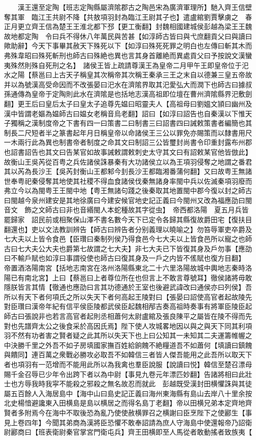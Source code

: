 　　漢王還至定陶【班志定陶縣屬濟隂郡古之陶邑宋為廣濟軍理所】馳入齊王信壁奪其軍　臨江王共尉不降【共敖項羽封為臨江王尉其子也】遣盧綰劉賈擊虜之　春正月更立齊王信為楚王王淮北都下邳【更工衡翻】封魏相國建城侯彭越為梁王王魏故地都定陶　令曰兵不得休八年萬民與苦甚【如淳師古皆曰與弋庶翻貢父曰與讀曰歟助辭】今天下事畢其赦天下殊死以下【如淳曰殊死死罪之明白也左傳曰斬其木而弗殊韋昭曰殊死斬刑也師古曰殊絶也異也言其身首離絶而異處貢父曰予按說文漢蠻夷殊然則殊自死刑之名】　諸侯王皆上疏請尊漢王為皇帝二月甲午王即皇帝位于汜水之陽【蔡邕曰上古天子稱皇其次稱帝其次稱王秦承三王之末自以德兼三皇五帝故并以為號漢高受命因而不改張晏曰汜水在濟隂界取其汜愛弘大而潤下也師古曰據叔孫通傳為皇帝于定陶則此水在濟隂是也括地志漢高祖即位壇在曹州濟隂縣界汜敷劍翻】更王后曰皇后太子曰皇太子追尊先媪曰昭靈夫人【高祖母曰劉媼文頴曰幽州及漢中皆謂老嫗為媪師古曰媪女老稱音烏老翻】詔曰【如淳曰詔告也自秦漢以下惟天子獨稱之漢制度帝之下書有四一曰策書二曰制書三曰詔書四曰誡敕策書者編簡也其制長二尺短者半之篆書起年月日稱皇帝以命諸侯王三公以罪免亦賜策而以隸書用尺一木兩行此為異也制書帝者制度之命其文曰制詔三公皆璽封尚書令印重封露布州郡也詔書詔告也其文曰告某官如故事誡敕謂敕刺史太守其文曰有詔敕某官他皆倣此】故衡山王吳芮從百粤之兵佐諸侯誅暴秦有大功諸侯立以為王項羽侵奪之地謂之番君其以芮為長沙王【吳芮封衡山王都邾今刲長沙王都臨湘番蒲何翻】又曰故粤王無諸世奉粤祀秦侵奪其地使其社稷不得血食諸侯伐秦無諸身率閩中兵以佐滅秦項羽廢而弗立今以為閩粤王王閩中地【粤王無諸句踐之後秦取其地置閩中郡今復以封之師古曰閩越今泉州建安是其地徐廣曰今建安候官地史記正義曰今閩州又改為福應劭曰閩音文　飾之文師古曰非也音緡閩人本蛇種故其字從虫】　帝西都洛陽　夏五月兵皆罷歸家　詔民前或相聚保山澤不書名數今天下已定令各歸其縣復故爵田宅【復扶目翻還也】吏以文法教訓辨告【師古曰辨告者分别義理以曉喻之】勿笞辱軍吏卒爵及七大夫以上皆令食邑【臣瓚曰秦制列侯乃得食邑今七大夫以上皆食邑所以寵之也師古曰七大夫公大夫也爵第七故謂之七大夫】非七大夫已下皆復其身及戶勿事【應劭曰不輸戶賦也如淳曰事謂役使也師古曰復其身及一戶之内皆不傜賦也復方目翻】　帝置酒洛陽南宮【括地志南宮在洛州洛陽縣東北二十六里洛陽故城中輿地志秦時洛陽已有南北宮】上曰【蔡邕曰上者尊位所在也但言上不敢言尊號耳】徹侯諸將毋敢隱朕皆言其情【徹通也應劭曰言其功德通於王室也後避武諱改曰通侯亦曰列侯】吾所以有天下者何項氏之所以失天下者何高起王陵對曰【張晏曰詔使高官者起故陵先對臣瓚曰漢帝年紀有信平侯臣陵都武侯臣起魏相邴吉奏高祖時奏事有將軍臣陵臣起師古曰張說非也若言高官者起則丞相蕭何太尉盧綰及張良陳平之屬皆在陵不得而先對也先譜齊太公之後食采於高因氏焉】陛下使人攻城畧地因以與之與天下同其利項羽不然有功者害之賢者疑之此其所以失天下也上曰公知其一未知其二夫運籌帷幄之中決勝千里之外吾不如子房填國家撫百姓給餉餽不絶糧道吾不如蕭何【填讀曰鎮餽與饋同】連百萬之衆戰必勝攻必取吾不如韓信三者皆人傑吾能用之此吾所以取天下者也項羽有一范增而不能用此所以為我禽也羣臣說服【說讀曰悦】韓信至楚召漂母賜千金召辱已少年令出跨下者以為中尉【事見九卷元年漂匹妙翻】告諸將相曰此壯士也方辱我時我寜不能殺之邪殺之無名故忍而就此　彭越既受漢封田横懼誅與其徒屬五百餘人入海居島中【海中山曰島史記正義曰海州東海縣有島山去岸八十里余按北史楊愔避讒東入田横島是島以横居之而得名島丁老翻】帝以田横兄弟本定齊地齊賢者多附焉今在海中不取後恐為亂乃使使赦横罪召之横謝曰臣烹陛下之使酈生【事見上卷四年】今聞其弟商為漢將臣恐懼不敢奉詔請為庶人守海島中使還報帝乃詔衛尉酈商曰【班表衛尉秦官掌宮門衛屯兵】齊王田横即至人馬從者敢動搖者致族夷【